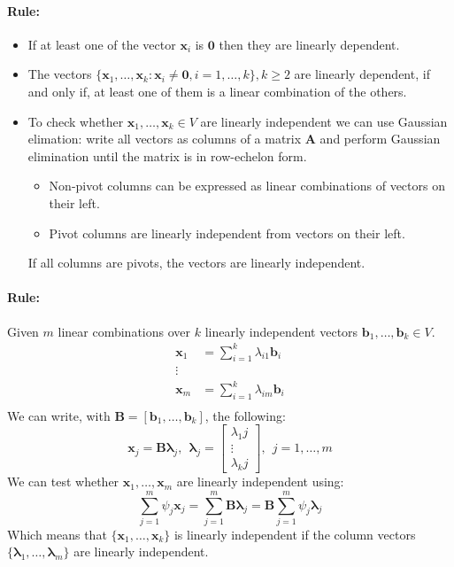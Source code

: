 \documentclass[12pt]{article}
\newcommand{\bx}{{\bm{x}}}
\newcommand{\A}{{\bm{A}}}
\newcommand{\B}{{\bm{B}}}
\newcommand{\vecs}[2]{{\bm{#1}_1, \dots, \bm{#1}_#2}}
\newcommand{\xrule}[1]{\paragraph{\colorbox{#1!30}{\textbf{Rule:}}}}
\begin{document}
\xrule{green}
%
\begin{itemize}
  \item If at least one of the vector $\bm{x}_i$ is $\bm{0}$ then they are linearly dependent.
  \item The vectors $\{\bx_1, \dots, \bx_k : \bx_i \neq \bm0, i =1, \dots, k\} , k \geqslant 2$ are linearly dependent, if and only if, at least one of them is a linear combination of the others.
  \item To check whether $\bx_1, \dots, \bx_k \in V$ are linearly independent we can use Gaussian elimation: write all vectors as columns of a matrix $\A$ and perform Gaussian elimination until the matrix is in row-echelon form.\begin{itemize}
  \item Non-pivot columns can be expressed as linear combinations of vectors on their left.
  \item Pivot columns are linearly independent from vectors on their left.
	  \end{itemize}
	  If all columns are pivots, the vectors are linearly independent.
\end{itemize}

\xrule{blue} Given $m$ linear combinations over $k$ linearly independent vectors $\bm{b}_1, \dots, \bm{b}_k \in V$.
%
\begin{equation}
	\begin{aligned}
		\bx_1 &= \sum\limits_{i=1}^k \lambda_{i1} \bm{b}_i \\
		\vdots & \\
		\bx_m &= \sum\limits_{i=1}^k \lambda_{im} \bm{b}_i \\
	\end{aligned}
\end{equation}
%
We can write, with $\B = [\bm{b}_1, \dots, \bm{b}_k]$, the following:
%
\begin{equation}
	\bx_j = \bm{B} \bm{\lambda}_j, \ \ \bm{\lambda}_j = \begin{bmatrix}
		\lambda_1j \\
		\vdots \\
		\lambda_kj
	\end{bmatrix}, \ \ j = 1, \dots,m 
\end{equation}
%
We can test whether $\bx_1, \dots, \bx_m$ are linearly independent using:
\begin{equation}
	\sum\limits_{j=1}^m \psi_j \bx_j = \sum\limits_{j=1}^m \B\bm{\lambda}_j = \B \sum\limits_{j=1}^m \psi_j \bm{\lambda}_j
\end{equation}
%
Which means that $\{\vecs{x}{k}\}$ is linearly independent if the column vectors $\{\vecs{\lambda}{m}\}$ are linearly independent.
\end{document}
